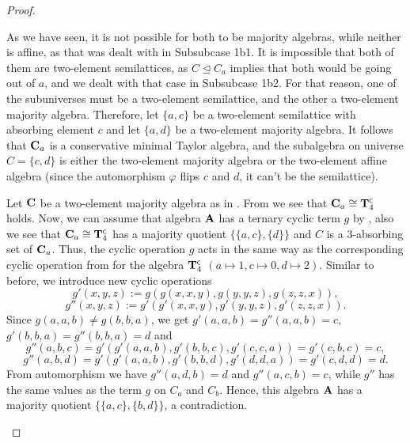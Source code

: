 \documentclass[11pt]{amsart}
\newcommand{\m}[1]{\mathbf{\uppercase{#1}}}
\newcommand{\co}{\scriptscriptstyle{\mathsf{C}}}
\theoremstyle{definition}
\theoremstyle{remark}
\theoremstyle{plain}
\begin{document}
\begin{proof}
\begin{enumerate}[wide, labelwidth=!,itemindent=!,labelindent=0pt]
\begin{enumerate}[wide, labelindent=0pt]
\begin{enumerate}[wide, labelwidth=!,labelindent=0pt,itemindent=!]
    As we have seen, it is not possible for both to be majority algebras, while neither is affine, as that was dealt with in {\sc Subsubcase 1b1}. It is impossible that both of them are two-element semilattices, as $C\trianglelefteq C_a$ implies that both would be going out of $a$, and we dealt with that case in {\sc Subsubcase 1b2}. For that reason, one of the subuniverses must be a two-element semilattice, and the other a two-element majority algebra. Therefore, let $\{a,c\}$ be a two-element semilattice with absorbing element $c$ and let $\{a,d\}$ be a two-element majority algebra. It follows that ${\m C}_a$ is a conservative minimal Taylor algebra, and the subalgebra on universe $C=\{c,d\}$ is either the two-element majority algebra or the two-element affine algebra (since the automorphism $\varphi$ flips $c$ and $d$, it can't be the semilattice).

Let ${\m C}$ be a two-element majority algebra as in . From  we see that ${\m C}_a\cong {\m T}_4^{\co}$ holds. Now, we can assume that algebra ${\m A}$ has a ternary cyclic term $g$ by , also we see that ${\m C}_a\cong {\m T}_4^{\co}$ has a majority quotient $\{\{a,c\},\{d\}\}$ and $C$ is a $3$-absorbing set of ${\m C}_a$. Thus, the cyclic operation $g$ acts in the same way as the corresponding cyclic operation from  for the algebra ${\m T}_4^{\co}$ $(a\mapsto 1, c\mapsto 0, d\mapsto 2)$. Similar to before, we introduce new cyclic operations
$$g'(x,y,z) := g(g(x,x,y),g(y,y,z),g(z,z,x)),$$
$$g''(x,y,z) := g'(g'(x,x,y),g'(y,y,z),g'(z,z,x)).$$
Since $g(a,a,b)\not= g(b,b,a)$, we get $g'(a,a,b)=g''(a,a,b)=c$, $g'(b,b,a)=g''(b,b,a)=d$ and
$$g''(a,b,c)=g'(g'(a,a,b),g'(b,b,c),g'(c,c,a))=g'(c,b,c)=c,$$
$$g''(a,b,d)=g'(g'(a,a,b),g'(b,b,d),g'(d,d,a))=g'(c,d,d)=d.$$
From automorphism we have $g''(a,d,b)=d$ and $g''(a,c,b)=c$, while  $g''$ has the same values as the term $g$ on $C_a$ and $C_b$. Hence, this algebra ${\m A}$ has a majority quotient $\{\{a,c\},\{b,d\}\}$, a contradiction.


\end{enumerate}
\end{enumerate}
\end{enumerate}
\end{proof}
\end{document}
